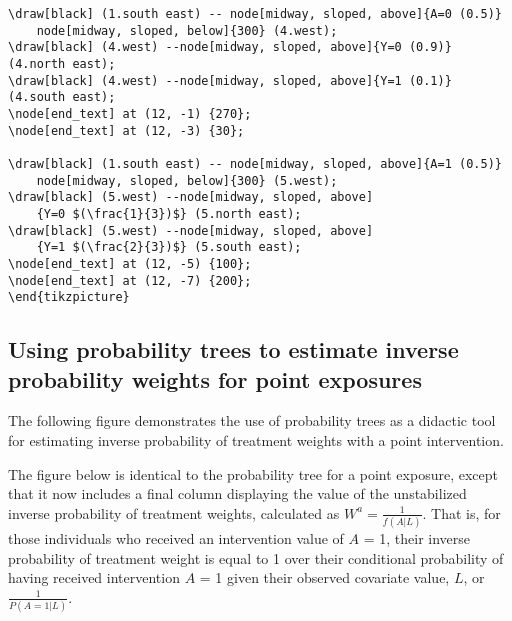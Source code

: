 \documentclass[a4paper]{report}
\begin{document}
\begin{framed}
\begin{Verbatim}
\draw[black] (1.south east) -- node[midway, sloped, above]{A=0 (0.5)} 
	node[midway, sloped, below]{300} (4.west);
\draw[black] (4.west) --node[midway, sloped, above]{Y=0 (0.9)} (4.north east);
\draw[black] (4.west) --node[midway, sloped, above]{Y=1 (0.1)} (4.south east);
\node[end_text] at (12, -1) {270};
\node[end_text] at (12, -3) {30};

\draw[black] (1.south east) -- node[midway, sloped, above]{A=1 (0.5)}
	node[midway, sloped, below]{300} (5.west);
\draw[black] (5.west) --node[midway, sloped, above]
	{Y=0 $(\frac{1}{3})$} (5.north east);
\draw[black] (5.west) --node[midway, sloped, above]
	{Y=1 $(\frac{2}{3})$} (5.south east);
\node[end_text] at (12, -5) {100};
\node[end_text] at (12, -7) {200};
\end{tikzpicture}
\end{Verbatim}

\end{framed}
\newpage
\subsection{Using probability trees to estimate inverse probability weights for point exposures}

The following figure demonstrates the use of probability trees as a didactic tool for estimating inverse probability of treatment weights with a point intervention.

The figure below is identical to the probability tree for a point exposure, except that it now includes a final column displaying the value of the unstabilized inverse probability of treatment weights, calculated as $W^a = \frac{1}{f\left(A|L\right)}$. That is, for those individuals who received an intervention value of $A$ = 1, their inverse probability of treatment weight is equal to 1 over their conditional probability of having received intervention $A$ = 1 given their observed covariate value, $L$, or $\frac{1}{P\left(A=1|L\right)}$. 


\vspace{3mm}
\end{document}
